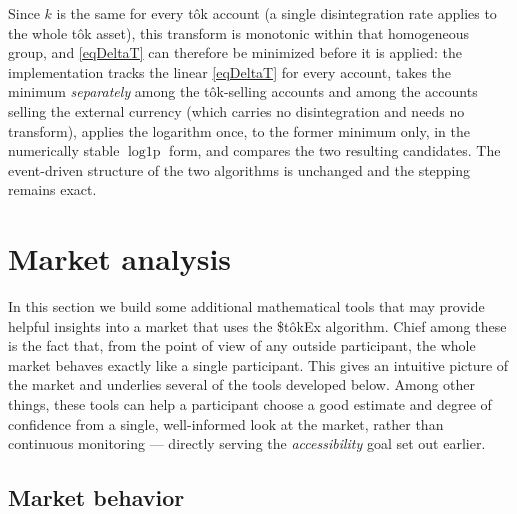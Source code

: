 \documentclass[letterpaper]{article}
\newcommand{\StokEx}{\$t\^{o}kEx}
\newcommand{\tok}{t\^{o}k}
\begin{document}
Since $k$ is the same for every \tok{} account (a single disintegration rate applies to the whole \tok{} asset), this transform is monotonic within that homogeneous group, and \eqref{eqDeltaT} can therefore be minimized before it is applied: the implementation tracks the linear \eqref{eqDeltaT} for every account, takes the minimum \emph{separately} among the \tok{}-selling accounts and among the accounts selling the external currency (which carries no disintegration and needs no transform), applies the logarithm once, to the former minimum only, in the numerically stable $\operatorname{log1p}$ form, and compares the two resulting candidates. The event-driven structure of the two algorithms is unchanged and the stepping remains exact.

\clearpage

\section{Market analysis}

In this section we build some additional mathematical tools that may provide helpful insights into a market that uses the \StokEx{} algorithm. Chief among these is the fact that, from the point of view of any outside participant, the whole market behaves exactly like a single participant. This gives an intuitive picture of the market and underlies several of the tools developed below. Among other things, these tools can help a participant choose a good estimate and degree of confidence from a single, well-informed look at the market, rather than continuous monitoring --- directly serving the \emph{accessibility} goal set out earlier.

\subsection{Market behavior}\label{secMarketBehavior}
\end{document}

